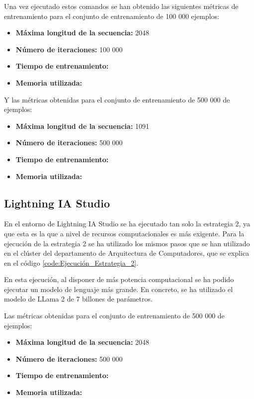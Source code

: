 Una vez ejecutado estos comandos se han obtenido las siguientes métricas de entrenamiento
para el conjunto de entrenamiento de 100 000 ejemplos:

\begin{itemize}
    \item \textbf{Máxima longitud de la secuencia:} 2048
    \item \textbf{Número de iteraciones:} 100 000
    \item \textbf{Tiempo de entrenamiento:}
    \item \textbf{Memoria utilizada:}
\end{itemize}

Y las métricas obtenidas para el conjunto de entrenamiento de 500 000 de ejemplos:

\begin{itemize}
    \item \textbf{Máxima longitud de la secuencia:} 1091
    \item \textbf{Número de iteraciones:} 500 000
    \item \textbf{Tiempo de entrenamiento:}
    \item \textbf{Memoria utilizada:}
\end{itemize}

\subsection{Lightning IA Studio}
\label{subsec:lightning_ia_studio_ejecucion}


En el entorno de Lightning IA Studio se ha ejecutado tan solo la estrategia 2, ya que
esta es la que a nivel de recursos computacionales es más exigente. Para la ejecución
de la estrategia 2 se ha utilizado los mismos pasos que se han utilizado en el clúster
del departamento de Arquitectura de Computadores, que se explica en el código \ref{code:Ejecución_Estrategia_2}.

En esta ejecución, al disponer de más potencia computacional se ha podido ejecutar un modelo
de lenguaje más grande. En concreto, se ha utilizado el modelo de LLama 2 de 7 billones de
parámetros.

Las métricas obtenidas para el conjunto de entrenamiento de 500 000 de ejemplos:

\begin{itemize}
    \item \textbf{Máxima longitud de la secuencia:} 2048
    \item \textbf{Número de iteraciones:} 500 000
    \item \textbf{Tiempo de entrenamiento:}
    \item \textbf{Memoria utilizada:}
\end{itemize}



